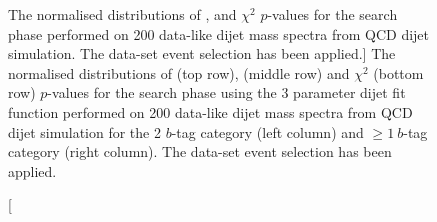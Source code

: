 \begin{figure}[!thb]
\begin{center}
  \end{center}
  \vspace{-1em}
  \caption
      [The normalised distributions of \bh{}, \dhunt{} and $\chi^{2}$  \mbox{$p$-value}s for
        the search phase performed on 200 data-like dijet mass spectra from QCD dijet simulation.
        The \summer{} data-set event selection has been applied.]
      {The normalised distributions of \bh{} (top row),  \dhunt{} (middle row) and $\chi^{2}$ (bottom row) \mbox{$p$-value}s for
        the search phase using the 3 parameter dijet fit function performed on
        200 data-like dijet mass spectra from QCD dijet simulation
        for the 2 $b$-tag category (left column) and $\geq1~b$-tag category (right column).
        The \summer{} data-set event selection has been applied.
        \label{fig:pValueHists}}

\end{figure}


\vspace{-0.25em}

